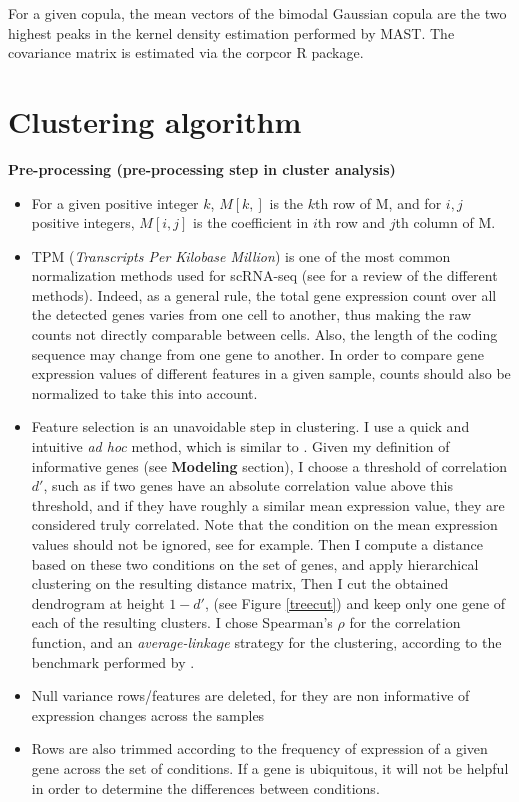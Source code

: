 \documentclass{report}
\begin{document}
{For a given copula, the mean vectors of the bimodal Gaussian copula are the two highest peaks in the kernel density estimation performed by MAST. The covariance matrix is estimated via the corpcor R package\cite{schafer2005shrinkage}.

\section*{Clustering algorithm}

\bigskip
\noindent \textbf{Pre-processing (pre-processing step in cluster analysis)}
\bigskip

\begin{itemize}
\item For a given positive integer $k$, $M[k,]$ is the $k$th row of M, and for $i,j$ positive integers, $M[i,j]$ is the coefficient in $i$th row and $j$th column of M.
\item TPM (\textit{Transcripts Per Kilobase Million}) is one of the most common normalization methods used for scRNA-seq (see \cite{normMethods} for a review of the different methods). Indeed, as a general rule, the total gene expression count over all the detected genes varies from one cell to another, thus making the raw counts not directly comparable between cells. Also, the length of the coding sequence may change from one gene to another. In order to compare gene expression values of different features in a given sample, counts should also be normalized to take this into account\cite{love2014moderated}. 
\item Feature selection is an unavoidable step in clustering\cite{liu2006efficient}. I use a quick and intuitive \textit{ad hoc} method, which is similar to \cite{kuhn2008caret}. Given my definition of informative genes (see \textbf{Modeling} section), I choose a threshold of correlation $d'$, such as if two genes have an absolute correlation value above this threshold, and if they have roughly a similar mean expression value, they are considered truly correlated. Note that the condition on the mean expression values should not be ignored, see \cite{guyon2003introduction} for example. Then I compute a distance based on these two conditions on the set of genes, and apply hierarchical clustering on the resulting distance matrix, Then I cut the obtained dendrogram at height $1-d'$, (see Figure \ref{treecut}) and keep only one gene of each of the resulting clusters. I chose Spearman's $\rho$ for the correlation function, and an \textit{average-linkage} strategy for the clustering, according to the benchmark performed by \cite{jaskowiak2014selection}.
\item Null variance rows/features are deleted, for they are non informative of expression changes across the samples
\item Rows are also trimmed according to the frequency of expression of a given gene across the set of conditions. If a gene is ubiquitous, it will not be helpful in order to determine the differences between conditions\cite{guo2015sincera}\cite{kiselev2016sc3}.
\end{itemize}

}
\end{document}
